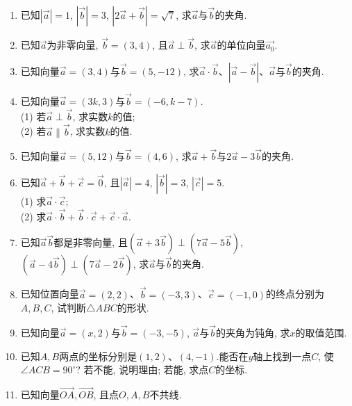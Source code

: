 \documentclass[10pt,a4paper]{article}
\begin{document}
\begin{enumerate}[1.]
\item 已知$|\overrightarrow a|=1$, $|\overrightarrow b|=3$, $|2\overrightarrow a+\overrightarrow b|=\sqrt 7$, 求$\overrightarrow a$与$\overrightarrow b$的夹角.
\item 已知$\overrightarrow a$为非零向量, $\overrightarrow b=(3,4)$, 且$\overrightarrow a\perp \overrightarrow b$, 求$\overrightarrow a$的单位向量$\overrightarrow {a_0}$.
\item 已知向量$\overrightarrow a=(3,4)$与$\overrightarrow b=(5,-12)$, 求$\overrightarrow a\cdot \overrightarrow b$、$|\overrightarrow a-\overrightarrow b|$、$\overrightarrow a$与$\overrightarrow b$的夹角.
\item 已知向量$\overrightarrow a=(3k,3)$与$\overrightarrow b=(-6,k-7)$.\\
(1) 若$\overrightarrow a\perp \overrightarrow b$, 求实数$k$的值;\\
(2) 若$\overrightarrow a\parallel \overrightarrow b$, 求实数$k$的值.
\item 已知向量$\overrightarrow a=(5,12)$与$\overrightarrow b=(4,6)$, 求$\overrightarrow a+\overrightarrow b$与$2\overrightarrow a-3\overrightarrow b$的夹角.
\item 已知$\overrightarrow a+\overrightarrow b+\overrightarrow c=\overrightarrow 0$, 且$|\overrightarrow a|=4$, $|\overrightarrow b|=3$, $|\overrightarrow c|=5$.\\
(1) 求$\overrightarrow a\cdot \overrightarrow c$;\\
(2) 求$\overrightarrow a\cdot \overrightarrow b+\overrightarrow b\cdot \overrightarrow c+\overrightarrow c\cdot \overrightarrow a$.
\item 已知$\overrightarrow a\overrightarrow b$都是非零向量, 且$(\overrightarrow a+3\overrightarrow b)\perp (7\overrightarrow a-5\overrightarrow b)$, $(\overrightarrow a-4\overrightarrow b)\perp (7\overrightarrow a-2\overrightarrow b)$, 求$\overrightarrow a$与$\overrightarrow b$的夹角.
\item 已知位置向量$\overrightarrow a=(2,2)$、$\overrightarrow b=(-3,3)$、$\overrightarrow c=(-1,0)$的终点分别为$A,B,C$, 试判断$\triangle ABC$的形状.
\item 已知向量$\overrightarrow a=(x,2)$与$\overrightarrow b=(-3,-5)$, $\overrightarrow a$与$\overrightarrow b$的夹角为钝角, 求$x$的取值范围.
\item 已知$A,B$两点的坐标分别是$(1,2)$、$(4,-1)$.能否在$y$轴上找到一点$C$, 使$\angle ACB=90^{\circ}$? 若不能, 说明理由; 若能, 求点$C$的坐标.
\item 已知向量$\overrightarrow{OA},\overrightarrow{OB}$, 且点$O,A,B$不共线.

\end{enumerate}
\end{document}
